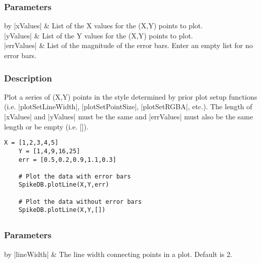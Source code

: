 \documentclass{report}
\begin{document}
\subsubsection{Parameters}
\begin{table}[h]
\begin{center}
\begin{tabular}{by}
		|xValues| & List of the X values for the (X,Y) points to plot.\\
		|yValues| & List of the Y values for the (X,Y) points to plot.\\
		|errValues| & List of the magnitude of the error bars. Enter an empty list for no error bars.\\
	\end{tabular}
\end{center}
\end{table}
\subsubsection{Description}
Plot a series of (X,Y) points in the style determined by prior plot setup functions (i.e. |plotSetLineWidth|, |plotSetPointSize|, |plotSetRGBA|, etc.). The length of |xValues| and |yValues| must be the same and |errValues| must also be the same length or be empty (i.e. []).
\begin{lstlisting}[caption=Example]
	X = [1,2,3,4,5]
	Y = [1,4,9,16,25]
	err = [0.5,0.2,0.9,1.1,0.3]

	# Plot the data with error bars
	SpikeDB.plotLine(X,Y,err)

	# Plot the data without error bars
	SpikeDB.plotLine(X,Y,[])
\end{lstlisting}



\clearpage
\subsection{}
\subsubsection{Parameters}
\begin{table}[h]
\begin{center}
\begin{tabular}{by}
		|lineWidth| & The line width connecting points in a plot. Default is 2.\\ 
	\end{tabular}
\end{center}
\end{table}
\end{document}

